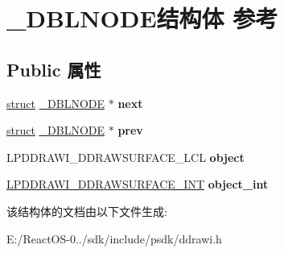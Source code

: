 \hypertarget{struct___d_b_l_n_o_d_e}{}\section{\+\_\+\+D\+B\+L\+N\+O\+D\+E结构体 参考}
\label{struct___d_b_l_n_o_d_e}
\subsection*{Public 属性}
\begin{DoxyCompactItemize}
\item 
\mbox{\label{struct___d_b_l_n_o_d_e_a84a4069f9de369d88a93a3afd4befc49}} 
\hyperlink{interfacestruct}{struct} \hyperlink{struct___d_b_l_n_o_d_e}{\+\_\+\+D\+B\+L\+N\+O\+DE} $\ast$ {\bfseries next}
\item 
\mbox{\label{struct___d_b_l_n_o_d_e_a818fce7a21183395a3893932b94f2109}} 
\hyperlink{interfacestruct}{struct} \hyperlink{struct___d_b_l_n_o_d_e}{\+\_\+\+D\+B\+L\+N\+O\+DE} $\ast$ {\bfseries prev}
\item 
\mbox{\label{struct___d_b_l_n_o_d_e_a1fc1a5e8fbdc55efd2b2255df7b5ff2e}} 
L\+P\+D\+D\+R\+A\+W\+I\+\_\+\+D\+D\+R\+A\+W\+S\+U\+R\+F\+A\+C\+E\+\_\+\+L\+CL {\bfseries object}
\item 
\mbox{\label{struct___d_b_l_n_o_d_e_a39fec46e65970d0b421ece65023b7d9c}} 
\hyperlink{struct___d_d_r_a_w_i___d_d_r_a_w_s_u_r_f_a_c_e___i_n_t}{L\+P\+D\+D\+R\+A\+W\+I\+\_\+\+D\+D\+R\+A\+W\+S\+U\+R\+F\+A\+C\+E\+\_\+\+I\+NT} {\bfseries object\+\_\+int}
\end{DoxyCompactItemize}


该结构体的文档由以下文件生成\+:\begin{DoxyCompactItemize}
\item 
E\+:/\+React\+O\+S-\/0../sdk/include/psdk/ddrawi.\+h\end{DoxyCompactItemize}
